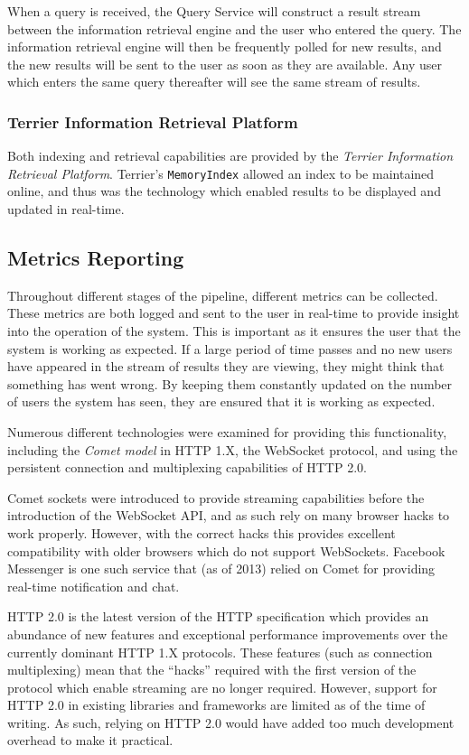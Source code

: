 \documentclass{l4proj}
\newcommand{\code}[1]{\texttt{#1}}
\begin{document}
        When a query is received, the Query Service will construct a result stream between the information retrieval engine and the user who entered the query. The information retrieval engine will then be frequently polled for new results, and the new results will be sent to the user as soon as they are available. Any user which enters the same query thereafter will see the same stream of results.
        
            \subsubsection{Terrier Information Retrieval Platform}
            Both indexing and retrieval capabilities are provided by the \textit{Terrier Information Retrieval Platform}. Terrier's \code{MemoryIndex} allowed an index to be maintained online, and thus was the technology which enabled results to be displayed and updated in real-time.
       
        \subsection{Metrics Reporting}
        Throughout different stages of the pipeline, different metrics can be collected. These metrics are both logged and sent to the user in real-time to provide insight into the operation of the system. This is important as it ensures the user that the system is working as expected. If a large period of time passes and no new users have appeared in the stream of results they are viewing, they might think that something has went wrong. By keeping them constantly updated on the number of users the system has seen, they are ensured that it is working as expected.
        
        Numerous different technologies were examined for providing this functionality, including the \textit{Comet model} in HTTP 1.X, the WebSocket protocol, and using the persistent connection and multiplexing capabilities of HTTP 2.0.
        
        Comet sockets were introduced to provide streaming capabilities before the introduction of the WebSocket API, and as such rely on many browser hacks to work properly. However, with the correct hacks this provides excellent compatibility with older browsers which do not support WebSockets. Facebook Messenger is one such service that (as of 2013) relied on Comet for providing real-time notification and chat.
        
        HTTP 2.0 is the latest version of the HTTP specification which provides an abundance of new features and exceptional performance improvements over the currently dominant HTTP 1.X protocols. These features (such as connection multiplexing) mean that the ``hacks'' required with the first version of the protocol which enable streaming are no longer required. However, support for HTTP 2.0 in existing libraries and frameworks are limited as of the time of writing. As such, relying on HTTP 2.0 would have added too much development overhead to make it practical.
        
\end{document}

